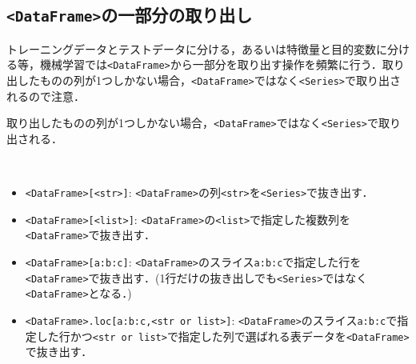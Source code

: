 \subsection{\texttt{<DataFrame>}の一部分の取り出し}

トレーニングデータとテストデータに分ける，あるいは特徴量と目的変数に分ける等，機械学習では\texttt{<DataFrame>}から一部分を取り出す操作を頻繁に行う．取り出したものの列が1つしかない場合，\texttt{<DataFrame>}ではなく\texttt{<Series>}で取り出されるので注意．

\begin{rem}
取り出したものの列が1つしかない場合，\texttt{<DataFrame>}ではなく\texttt{<Series>}で取り出される．
\end{rem}

\begin{gram}　
\begin{itemize}
\item \texttt{<DataFrame>[<str>]}: \texttt{<DataFrame>}の列\texttt{<str>}を\texttt{<Series>}で抜き出す．
\item \texttt{<DataFrame>[<list>]}: \texttt{<DataFrame>}の\texttt{<list>}で指定した複数列を\texttt{<DataFrame>}で抜き出す．
\item \texttt{<DataFrame>[a:b:c]}: \texttt{<DataFrame>}のスライス\texttt{a:b:c}で指定した行を\texttt{<DataFrame>}で抜き出す．(1行だけの抜き出しでも\texttt{<Series>}ではなく\texttt{<DataFrame>}となる．)
\item \texttt{<DataFrame>.loc[a:b:c,<str or list>]}: \texttt{<DataFrame>}のスライス\texttt{a:b:c}で指定した行かつ\texttt{<str or list>}で指定した列で選ばれる表データを\texttt{<DataFrame>}で抜き出す．
\end{itemize}
\end{gram}

